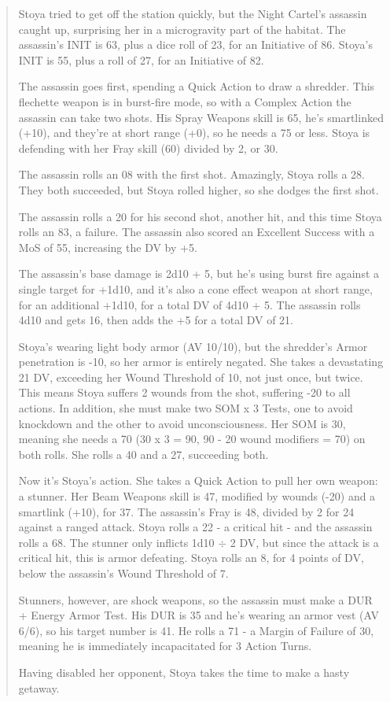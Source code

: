\begin{quotation}
Stoya tried to get off the station quickly, but the Night Cartel’s assassin caught up, surprising her in a microgravity part of the habitat. The assassin’s INIT is 63, plus a dice roll of 23, for an Initiative of 86. Stoya’s INIT is 55, plus a roll of 27, for an Initiative of 82.

The assassin goes first, spending a Quick Action to draw a shredder. This flechette weapon is in burst-fire mode, so with a Complex Action the assassin can take two shots. His Spray Weapons skill is 65, he’s smartlinked (+10), and they’re at short range (+0), so he needs a 75 or less. Stoya is defending with her Fray skill (60) divided by 2, or 30.

The assassin rolls an 08 with the first shot. Amazingly, Stoya rolls a 28. They both succeeded, but Stoya rolled higher, so she dodges the first shot.

The assassin rolls a 20 for his second shot, another hit, and this time Stoya rolls an 83, a failure. The assassin also scored an Excellent Success with a MoS of 55, increasing the DV by +5.

The assassin’s base damage is 2d10 + 5, but he’s using burst fire against a single target for +1d10, and it’s also a cone effect weapon at short range, for an additional +1d10, for a total DV of 4d10 + 5. The assassin rolls 4d10 and gets 16, then adds the +5 for a total DV of 21.

Stoya’s wearing light body armor (AV 10/10), but the shredder’s Armor penetration is -10, so her armor is entirely negated. She takes a devastating 21 DV, exceeding her Wound Threshold of 10, not just once, but twice. This means Stoya suffers 2 wounds from the shot, suffering -20 to all actions. In addition, she must make two SOM x 3 Tests, one to avoid knockdown and the other to avoid unconsciousness. Her SOM is 30, meaning she needs a 70 (30 x 3 = 90, 90 - 20 wound modifiers = 70) on both rolls. She rolls a 40 and a 27, succeeding both.

Now it’s Stoya’s action. She takes a Quick Action to pull her own weapon: a stunner. Her Beam Weapons skill is 47, modified by wounds (-20) and a smartlink (+10), for 37. The assassin’s Fray is 48, divided by 2 for 24 against a ranged attack. Stoya rolls a 22 - a critical hit - and the assassin rolls a 68. The stunner only inflicts 1d10 $\div$ 2 DV, but since the attack is a critical hit, this is armor defeating. Stoya rolls an 8, for 4 points of DV, below the assassin’s Wound Threshold of 7.

Stunners, however, are shock weapons, so the assassin must make a DUR + Energy Armor Test. His DUR is 35 and he’s wearing an armor vest (AV 6/6), so his target number is 41. He rolls a 71 - a Margin of Failure of 30, meaning he is immediately incapacitated for 3 Action Turns.

Having disabled her opponent, Stoya takes the time to make a hasty getaway.
\end{quotation}


